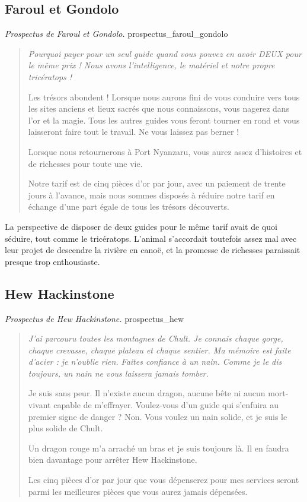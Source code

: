 \subsection*{Faroul et Gondolo}

{\textit{Prospectus de Faroul et Gondolo.}}
{prospectus_faroul_gondolo}

\begin{quote}\itshape
Pourquoi payer pour un seul guide quand vous pouvez en avoir DEUX pour le même prix ! Nous avons l'intelligence, le matériel et notre propre tricératops !

Les trésors abondent ! Lorsque nous aurons fini de vous conduire vers tous les sites anciens et lieux sacrés que nous connaissons, vous nagerez dans l'or et la magie. Tous les autres guides vous feront tourner en rond et vous laisseront faire tout le travail. Ne vous laissez pas berner !

Lorsque nous retournerons à Port Nyanzaru, vous aurez assez d'histoires et de richesses pour toute une vie.

Notre tarif est de cinq pièces d'or par jour, avec un paiement de trente jours à l'avance, mais nous sommes disposés à réduire notre tarif en échange d'une part égale de tous les trésors découverts.
\end{quote}

La perspective de disposer de deux guides pour le même tarif avait de quoi séduire, tout comme le tricératops. L'animal s'accordait toutefois assez mal avec leur projet de descendre la rivière en canoë, et la promesse de richesses paraissait presque trop enthousiaste.

\subsection*{Hew Hackinstone}

{\textit{Prospectus de Hew Hackinstone.}}
{prospectus_hew}

\begin{quote}\itshape
J'ai parcouru toutes les montagnes de Chult. Je connais chaque gorge, chaque crevasse, chaque plateau et chaque sentier. Ma mémoire est faite d'acier : je n'oublie rien. Faites confiance à un nain. Comme je le dis toujours, un nain ne vous laissera jamais tomber.

Je suis sans peur. Il n'existe aucun dragon, aucune bête ni aucun mort-vivant capable de m'effrayer. Voulez-vous d'un guide qui s'enfuira au premier signe de danger ? Non. Vous voulez un nain solide, et je suis le plus solide de Chult.

Un dragon rouge m'a arraché un bras et je suis toujours là. Il en faudra bien davantage pour arrêter Hew Hackinstone.

Les cinq pièces d'or par jour que vous dépenserez pour mes services seront parmi les meilleures pièces que vous aurez jamais dépensées.
\end{quote}

